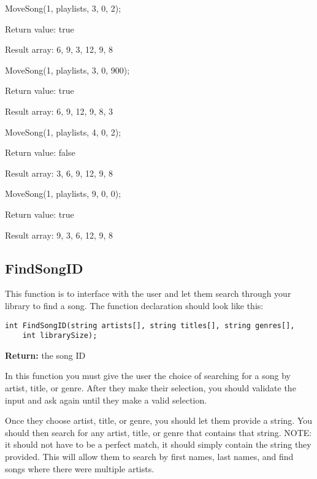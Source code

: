 \begin{sample}
MoveSong(1, playlists, 3, 0, 2);

Return value: true

Result array: 6, 9, 3, 12, 9, 8
\end{sample}

\begin{sample}
MoveSong(1, playlists, 3, 0, 900);

Return value: true

Result array: 6, 9, 12, 9, 8, 3
\end{sample}

\begin{sample}
MoveSong(1, playlists, 4, 0, 2);

Return value: false

Result array: 3, 6, 9, 12, 9, 8
\end{sample}

\begin{sample}
MoveSong(1, playlists, 9, 0, 0);

Return value: true

Result array: 9, 3, 6, 12, 9, 8
\end{sample}

\subsection{FindSongID \star \star \star}
This function is to interface with the user and let them search through your library to find a song. The function declaration should look like this:

\begin{verbatim}
int FindSongID(string artists[], string titles[], string genres[],
    int librarySize);
\end{verbatim}

\textbf{Return:} the song ID

In this function you must give the user the choice of searching for a song by artist, title, or genre. After they make their selection, you should validate the input and ask again until they make a valid selection. 

Once they choose artist, title, or genre, you should let them provide a string. You should then search for any artist, title, or genre that contains that string. NOTE: it should not have to be a perfect match, it should simply contain the string they provided. This will allow them to search by first names, last names, and find songs where there were multiple artists. 

